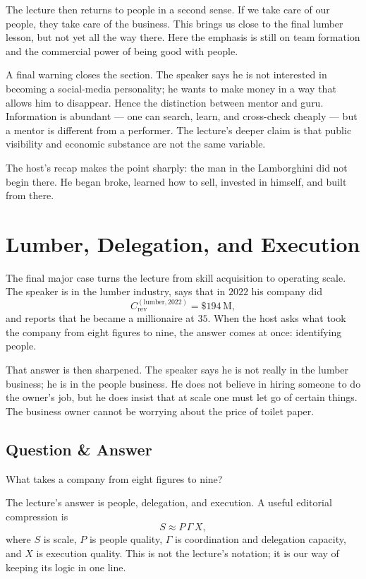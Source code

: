 The lecture then returns to people in a second sense. If we take care of our people, they take care of the business. This brings us close to the final lumber lesson, but not yet all the way there. Here the emphasis is still on team formation and the commercial power of being good with people.

A final warning closes the section. The speaker says he is not interested in becoming a social-media personality; he wants to make money in a way that allows him to disappear. Hence the distinction between mentor and guru. Information is abundant --- one can search, learn, and cross-check cheaply --- but a mentor is different from a performer. The lecture's deeper claim is that public visibility and economic substance are not the same variable.

The host's recap makes the point sharply: the man in the Lamborghini did not begin there. He began broke, learned how to sell, invested in himself, and built from there.

\section{Lumber, Delegation, and Execution}

The final major case turns the lecture from skill acquisition to operating scale. The speaker is in the lumber industry, says that in \(2022\) his company did
\[
C_{\text{rev}}^{(\mathrm{lumber},2022)}=\$194\,\mathrm{M},
\]
and reports that he became a millionaire at \(35\). When the host asks what took the company from eight figures to nine, the answer comes at once: identifying people.

That answer is then sharpened. The speaker says he is not really in the lumber business; he is in the people business. He does not believe in hiring someone to do the owner's job, but he does insist that at scale one must let go of certain things. The business owner cannot be worrying about the price of toilet paper.

\subsection{Question \& Answer}

What takes a company from eight figures to nine?

The lecture's answer is people, delegation, and execution. A useful editorial compression is
\begin{equation}
S \approx P\,\Gamma\,X,
\end{equation}
where \(S\) is scale, \(P\) is people quality, \(\Gamma\) is coordination and delegation capacity, and \(X\) is execution quality. This is not the lecture's notation; it is our way of keeping its logic in one line.

